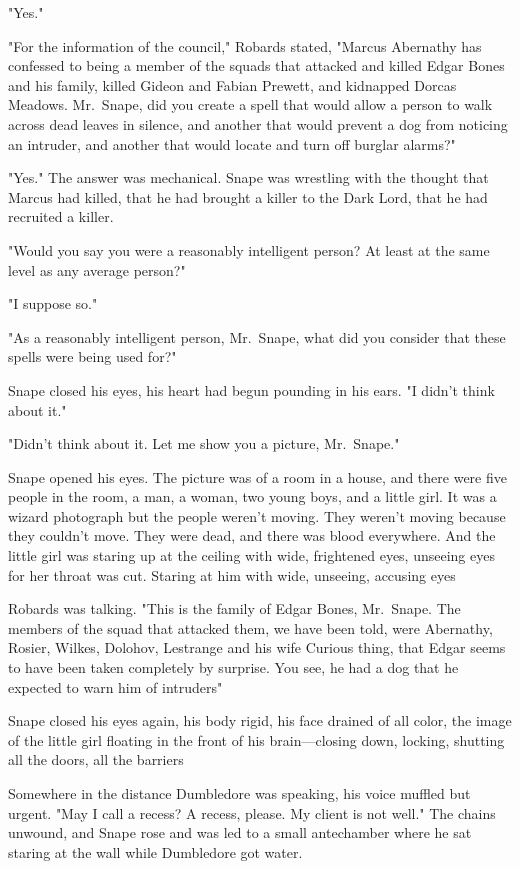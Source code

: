 "Yes."

"For the information of the council," Robards stated, "Marcus Abernathy has confessed to being a member of the squads that attacked and killed Edgar Bones and his family, killed Gideon and Fabian Prewett, and kidnapped Dorcas Meadows. Mr.~Snape, did you create a spell that would allow a person to walk across dead leaves in silence, and another that would prevent a dog from noticing an intruder, and another that would locate and turn off burglar alarms?"

"Yes." The answer was mechanical. Snape was wrestling with the thought that Marcus had killed, that he had brought a killer to the Dark Lord, that he had recruited a killer.

"Would you say you were a reasonably intelligent person? At least at the same level as any average person?"

"I suppose so."

"As a reasonably intelligent person, Mr.~Snape, what did you consider that these spells were being used for?"

Snape closed his eyes, his heart had begun pounding in his ears. "I{\el} didn't think about it."

"Didn't think about it. Let me show you a picture, Mr.~Snape."

Snape opened his eyes. The picture was of a room in a house, and there were five people in the room, a man, a woman, two young boys, and a little girl. It was a wizard photograph but the people weren't moving. They weren't moving because they couldn't move. They were dead, and there was blood everywhere. And the little girl was staring up at the ceiling with wide, frightened eyes, unseeing eyes for her throat was cut. Staring at him with wide, unseeing, accusing eyes{\el}

Robards was talking. "This is the family of Edgar Bones, Mr.~Snape. The members of the squad that attacked them, we have been told, were Abernathy, Rosier, Wilkes, Dolohov, Lestrange and his wife{\el} Curious thing, that Edgar seems to have been taken completely by surprise. You see, he had a dog that he expected to warn him of intruders{\el}"

Snape closed his eyes again, his body rigid, his face drained of all color, the image of the little girl floating in the front of his brain—closing down, locking, shutting all the doors, all the barriers{\el}

Somewhere in the distance Dumbledore was speaking, his voice muffled but urgent. "May I call a recess? A recess, please. My client is not well." The chains unwound, and Snape rose and was led to a small antechamber where he sat staring at the wall while Dumbledore got water.

